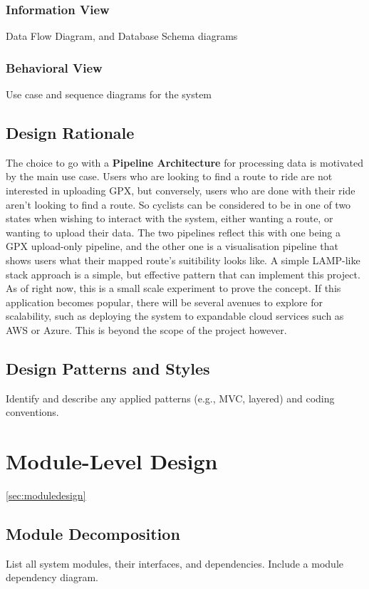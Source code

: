 \documentclass[11pt,a4paper]{report}
\begin{document}
\subsubsection{Information View}
Data Flow Diagram, and Database Schema diagrams
\subsubsection{Behavioral View}
Use case and sequence diagrams for the system

\subsection{Design Rationale}
The choice to go with a \textbf{Pipeline Architecture} for processing data is motivated by the main use case. Users who are looking
to find a route to ride are not interested in uploading GPX, but conversely, users who are done with their ride aren't looking to
find a route. So cyclists can be considered to be in one of two states when wishing to interact with the system, either wanting a route,
or wanting to upload their data. The two pipelines reflect this with one being a GPX upload-only pipeline, and the other one is a visualisation
pipeline that shows users what their mapped route's suitibility looks like.
A simple LAMP-like stack approach is a simple, but effective pattern that can implement this project. As of right now, this is a small scale
experiment to prove the concept. If this application becomes popular, there will be several avenues to explore for scalability, such as deploying the
system to expandable cloud services such as AWS or Azure. This is beyond the scope of the project however.

\subsection{Design Patterns and Styles}
Identify and describe any applied patterns (e.g., MVC, layered) and coding conventions.

\section{Module-Level Design}
\ref{sec:moduledesign}
\subsection{Module Decomposition}
List all system modules, their interfaces, and dependencies. Include a module dependency diagram.
\end{document}
